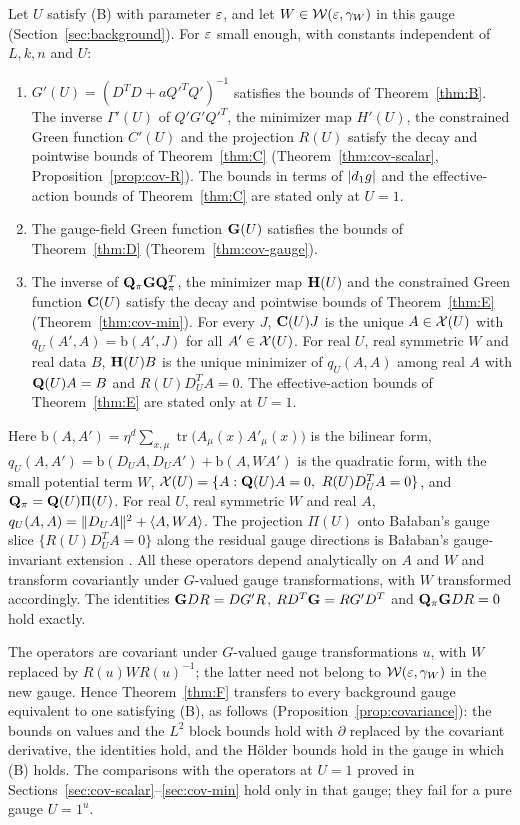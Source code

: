 \begin{maintheorem}\label{thm:F}
Let $U$ satisfy (B) with parameter $\varepsilon$, and let $W\in\mathcal W(\varepsilon,\gamma_W)$ in this gauge (Section~\ref{sec:background}). For $\varepsilon$ small enough, with constants independent of $L,k,n$ and $U$:
\begin{enumerate}[label=(\roman*)]
\item $G'(U)=(D^TD+aQ'^TQ')^{-1}$ satisfies the bounds of Theorem~\ref{thm:B}. The inverse $\Gamma'(U)$ of $Q'G'Q'^T$, the minimizer map $H'(U)$, the constrained Green function $C'(U)$ and the projection $R(U)$ satisfy the decay and pointwise bounds of Theorem~\ref{thm:C} (Theorem~\ref{thm:cov-scalar}, Proposition~\ref{prop:cov-R}). The bounds in terms of $|d_1 g|$ and the effective-action bounds of Theorem~\ref{thm:C} are stated only at $U=1$.
\item The gauge-field Green function $\mathbf G(U)$ satisfies the bounds of Theorem~\ref{thm:D} (Theorem~\ref{thm:cov-gauge}).
\item The inverse of $\mathbf Q_\pi\mathbf G\mathbf Q_\pi^T$, the minimizer map $\mathbf H(U)$ and the constrained Green function $\mathbf C(U)$ satisfy the decay and pointwise bounds of Theorem~\ref{thm:E} (Theorem~\ref{thm:cov-min}). For every $J$, $\mathbf C(U)J$ is the unique $A\in\mathcal X(U)$ with $q_U(A',A)=\mathrm b(A',J)$ for all $A'\in\mathcal X(U)$. For real $U$, real symmetric $W$ and real data $B$, $\mathbf H(U)B$ is the unique minimizer of $q_U(A,A)$ among real $A$ with $\mathbf Q(U)A=B$ and $R(U)D_U^TA=0$. The effective-action bounds of Theorem~\ref{thm:E} are stated only at $U=1$.
\end{enumerate}
Here $\mathrm b(A,A')=\eta^d\sum_{x,\mu}\operatorname{tr}\big(A_\mu(x)A'_\mu(x)\big)$ is the bilinear form, $q_U(A,A')=\mathrm b(D_UA,D_UA')+\mathrm b(A,WA')$ is the quadratic form, with the small potential term $W$, $\cX(U)=\{A:\bQ(U)A=0,\ R(U)D_U^TA=0\}$, and $\mathbf Q_\pi=\mathbf Q(U)\Pi(U)$. For real $U$, real symmetric $W$ and real $A$, $q_U(A,A)=\|D_UA\|^2+\langle A,WA\rangle$. The projection $\Pi(U)$ onto Ba\l aban's gauge slice $\{R(U)D_U^TA=0\}$ along the residual gauge directions is Ba\l aban's gauge-invariant extension \cite[(3.118)--(3.119)]{BalBackground}. All these operators depend analytically on $A$ and $W$ and transform covariantly under $G$-valued gauge transformations, with $W$ transformed accordingly. The identities $\mathbf G DR=DG'R$, $RD^T\mathbf G=RG'D^T$ and $\mathbf Q_\pi\mathbf G DR=0$ hold exactly.
\end{maintheorem}

The operators are covariant under $G$-valued gauge transformations $u$, with $W$ replaced by $R(u)WR(u)^{-1}$; the latter need not belong to $\mathcal W(\varepsilon,\gamma_W)$ in the new gauge. Hence Theorem~\ref{thm:F} transfers to every background gauge equivalent to one satisfying (B), as follows (Proposition~\ref{prop:covariance}): the bounds on values and the $L^2$ block bounds hold with $\partial$ replaced by the covariant derivative, the identities hold, and the H\"older bounds hold in the gauge in which (B) holds. The comparisons with the operators at $U=1$ proved in Sections~\ref{sec:cov-scalar}--\ref{sec:cov-min} hold only in that gauge; they fail for a pure gauge $U=1^u$.

